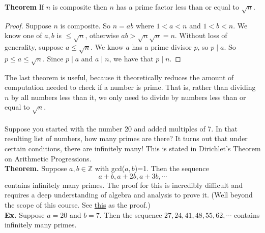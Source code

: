 \documentclass[class=article, crop=false]{standalone}
\def\integers{{\mathbb Z}}
\begin{document}
\noindent\textbf{Theorem} If $n$ is composite then $n$ has a prime factor less than or equal to $\sqrt{n}$.
\begin{proof}
	Suppose $n$ is composite. So $n=ab$ where $1<a<n$ and $1<b<n$. We know one of $a,b$ is $\leq\sqrt{n}$,
	otherwise $ab>\sqrt{n}\sqrt{n}=n$. Without loss of generality, suppose $a\leq\sqrt{n}$. We know $a$ has a
	prime divisor $p$, so $p\mid a$. So $p\leq a\leq\sqrt{n}$. Since $p\mid a$ and $a\mid n$, we have that
	$p\mid n$.
\end{proof}
\noindent The last theorem is useful, because it theoretically reduces the amount of computation needed to
check if a number is prime. That is, rather than dividing $n$ by all numbers less than it, we only need to 
divide by numbers less than or equal to $\sqrt{n}$.\\\\
Suppose you started with the number 20 and added multiples of 7. In that resulting list of numbers, how many
primes are there? It turns out that under certain conditions, there are infinitely many! This is stated in
Dirichlet's Theorem on Arithmetic Progressions.\\
\textbf{Theorem.} Suppose $a,b\in\integers$ with gcd($a,b$)=1. Then the sequence
$$a+b, a+2b, a+3b, \cdots$$
contains infinitely many primes. The proof for this is incredibly difficult and requires a deep understanding
of algebra and analysis to prove it. (Well beyond the scope of this course. See \href{https://math.rice.edu/~av15/Files/Dirichlet.pdf}{this}
as the proof.)\\
\textbf{Ex.} Suppose $a=20$ and $b=7$. Then the sequence $27,24,41,48,55,62,\cdots$ contains infinitely many primes.
\end{document}
